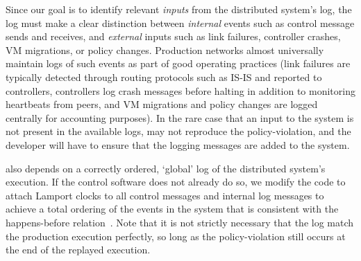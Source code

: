 Since our goal is to identify
relevant {\em inputs} from the distributed system's log, the log must make a clear
distinction between {\em internal} events such as control message sends and
receives, and {\em external} inputs such as
link failures, controller crashes, VM migrations, or policy changes.
Production networks almost universally maintain logs of such events as part of
good operating practices (link failures are typically detected through
routing protocols such as IS-IS and reported to controllers,
controllers log crash messages before
halting in addition to monitoring heartbeats from peers, and VM migrations and
policy changes are logged centrally for accounting purposes). In the rare case
that an input to the system is not present in the available logs,
\simulator{} may not reproduce the policy-violation, and the developer will
have to ensure that the logging messages are added to the system.

\Simulator{} also depends on a correctly ordered, `global' log of the
distributed system's execution. If the control software does not already do
so, we modify the code to attach Lamport
clocks to all
control messages and internal log messages
to achieve a total ordering of the events in the system that
is consistent with the happens-before
relation~\cite{Lamport:1978:TCO:359545.359563}. Note that it is not
strictly necessary that the log match the production execution perfectly, so
long as the policy-violation still occurs at the end of the replayed
execution.


%
%

